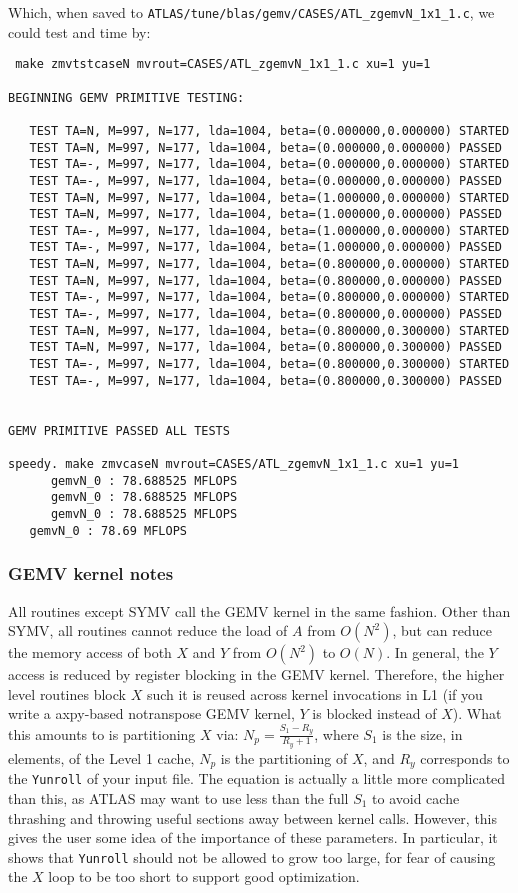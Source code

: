 \documentclass[11pt]{article}
\begin{document}
Which, when saved to {\tt ATLAS/tune/blas/gemv/CASES/ATL\_zgemvN\_1x1\_1.c},
we could test and time by:
\begin{verbatim}
 make zmvtstcaseN mvrout=CASES/ATL_zgemvN_1x1_1.c xu=1 yu=1

BEGINNING GEMV PRIMITIVE TESTING:

   TEST TA=N, M=997, N=177, lda=1004, beta=(0.000000,0.000000) STARTED
   TEST TA=N, M=997, N=177, lda=1004, beta=(0.000000,0.000000) PASSED
   TEST TA=-, M=997, N=177, lda=1004, beta=(0.000000,0.000000) STARTED
   TEST TA=-, M=997, N=177, lda=1004, beta=(0.000000,0.000000) PASSED
   TEST TA=N, M=997, N=177, lda=1004, beta=(1.000000,0.000000) STARTED
   TEST TA=N, M=997, N=177, lda=1004, beta=(1.000000,0.000000) PASSED
   TEST TA=-, M=997, N=177, lda=1004, beta=(1.000000,0.000000) STARTED
   TEST TA=-, M=997, N=177, lda=1004, beta=(1.000000,0.000000) PASSED
   TEST TA=N, M=997, N=177, lda=1004, beta=(0.800000,0.000000) STARTED
   TEST TA=N, M=997, N=177, lda=1004, beta=(0.800000,0.000000) PASSED
   TEST TA=-, M=997, N=177, lda=1004, beta=(0.800000,0.000000) STARTED
   TEST TA=-, M=997, N=177, lda=1004, beta=(0.800000,0.000000) PASSED
   TEST TA=N, M=997, N=177, lda=1004, beta=(0.800000,0.300000) STARTED
   TEST TA=N, M=997, N=177, lda=1004, beta=(0.800000,0.300000) PASSED
   TEST TA=-, M=997, N=177, lda=1004, beta=(0.800000,0.300000) STARTED
   TEST TA=-, M=997, N=177, lda=1004, beta=(0.800000,0.300000) PASSED


GEMV PRIMITIVE PASSED ALL TESTS

speedy. make zmvcaseN mvrout=CASES/ATL_zgemvN_1x1_1.c xu=1 yu=1
      gemvN_0 : 78.688525 MFLOPS
      gemvN_0 : 78.688525 MFLOPS
      gemvN_0 : 78.688525 MFLOPS
   gemvN_0 : 78.69 MFLOPS

\end{verbatim}

\subsubsection{GEMV kernel notes}
All routines except SYMV call the GEMV kernel in the same fashion.
Other than SYMV, all routines cannot reduce the load of $A$ from $O(N^2)$,
but can reduce the memory access of both $X$ and $Y$ from $O(N^2)$ to
$O(N)$.  In general, the $Y$ access is reduced by register blocking in
the GEMV kernel.  Therefore, the higher level routines block $X$ such
it is reused across kernel invocations in L1 (if you write a axpy-based
notranspose GEMV kernel, $Y$ is blocked instead of $X$).  What this amounts
to is partitioning $X$ via:
$N_p = \frac{S_1 - R_y}{R_y+1}$, where $S_1$ is the size, in elements,
of the Level 1 cache, $N_p$ is the partitioning of $X$, and $R_y$ corresponds
to the {\tt Yunroll} of your input file.  The equation is actually a little
more complicated than this, as ATLAS may want to use less than the full 
$S_1$ to avoid cache thrashing and throwing useful sections away between
kernel calls.  However, this gives the user some idea of the importance of
these parameters.  In particular, it shows that {\tt Yunroll} should not
be allowed to grow too large, for fear of causing the $X$ loop to be
too short to support good optimization.
\end{document}
